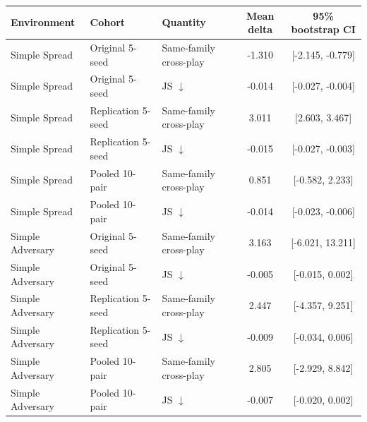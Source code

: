 \begin{tabular}{lllcc}
\toprule
Environment & Cohort & Quantity & Mean delta & 95\% bootstrap CI \\
\midrule
Simple Spread & Original 5-seed & Same-family cross-play & -1.310 & [-2.145, -0.779] \\
Simple Spread & Original 5-seed & JS $\downarrow$ & -0.014 & [-0.027, -0.004] \\
\midrule
Simple Spread & Replication 5-seed & Same-family cross-play & 3.011 & [2.603, 3.467] \\
Simple Spread & Replication 5-seed & JS $\downarrow$ & -0.015 & [-0.027, -0.003] \\
\midrule
Simple Spread & Pooled 10-pair & Same-family cross-play & 0.851 & [-0.582, 2.233] \\
Simple Spread & Pooled 10-pair & JS $\downarrow$ & -0.014 & [-0.023, -0.006] \\
\midrule
Simple Adversary & Original 5-seed & Same-family cross-play & 3.163 & [-6.021, 13.211] \\
Simple Adversary & Original 5-seed & JS $\downarrow$ & -0.005 & [-0.015, 0.002] \\
\midrule
Simple Adversary & Replication 5-seed & Same-family cross-play & 2.447 & [-4.357, 9.251] \\
Simple Adversary & Replication 5-seed & JS $\downarrow$ & -0.009 & [-0.034, 0.006] \\
\midrule
Simple Adversary & Pooled 10-pair & Same-family cross-play & 2.805 & [-2.929, 8.842] \\
Simple Adversary & Pooled 10-pair & JS $\downarrow$ & -0.007 & [-0.020, 0.002] \\
\bottomrule
\end{tabular}

